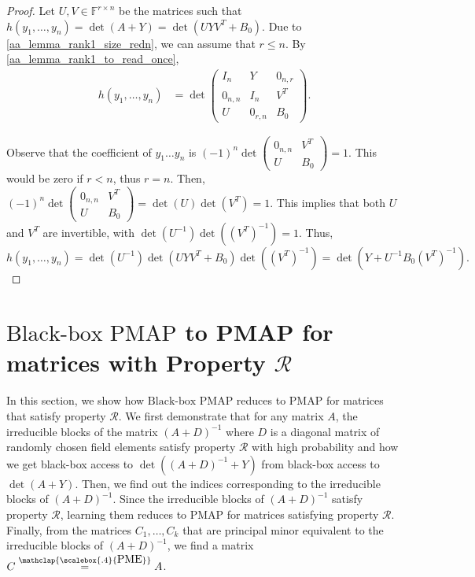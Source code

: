 \documentclass[11pt,letterpaper]{article}
\newcommand{\F}{\mathbb{F}}
\newcommand{\PME}{\stackrel{\mathclap{\scalebox{.4}{\mbox{PME}}}}{=}}
\newcommand{\prop}{\mathcal{R}}
\newcommand{\probB}{\text{Black-box PMAP}}
\begin{document}
{{{\begin{proof}

Let $U, V \in \F^{r \times n}$ be the matrices such that $h(y_1,\dots,y_n) = \det(A + Y) = \det(UYV^T + B_0)$. Due to \cref{aa_lemma_rank1_size_redn}, we can assume that $r \leq n$. By \cref{aa_lemma_rank1_to_read_once},
\begin{align*}
h(y_1,\dots,y_n) &= \det\begin{pmatrix}
        I_n & Y & 0_{n,r} \\
        0_{n,n} & I_{n} & V^T \\
        U & 0_{r,n} & B_0
    \end{pmatrix}\text{.}
\end{align*}

Observe that the coefficient of $y_1 \dots y_n$ is $(-1)^n\det\begin{pmatrix}0_{n,n} & V^T \\ U & B_0\end{pmatrix} = 1$. This would be zero if $r<n$, thus $r=n$. Then, $(-1)^n\det\begin{pmatrix}0_{n,n} & V^T \\ U & B_0\end{pmatrix} = \det(U)\det(V^T) = 1$. This implies that both $U$ and $V^T$ are invertible, with $\det(U^{-1})\det({(V^T)}^{-1}) = 1$. Thus,
\begin{equation*}
h(y_1,\dots,y_n) = \det(U^{-1})\det(UYV^T + B_0)\det({(V^T)}^{-1})
    = \det(Y + U^{-1}B_0{(V^T)}^{-1})\text{.}
\end{equation*}
\end{proof}
\section{$\probB$ to PMAP for matrices with Property $\prop$} \label{sec:reduction to matrices with prop R}

In this section, we show how $\probB$ reduces to PMAP for matrices that satisfy property $\prop$. We first demonstrate that for any matrix $A$, the irreducible blocks of the matrix $(A+D)^{-1}$ where $D$ is a diagonal matrix of randomly chosen field elements satisfy property $\prop$ with high probability and how we get black-box access to $\det((A + D)^{-1} + Y)$ from black-box access to $\det(A + Y)$. Then, we find out the indices corresponding to the irreducible blocks of $(A+D)^{-1}$. Since the irreducible blocks of $(A+D)^{-1}$ satisfy property $\prop$, learning them reduces to PMAP for matrices satisfying property $\prop$. Finally, from the matrices $C_1,\dots,C_k$ that are principal minor equivalent to the irreducible blocks of $(A+D)^{-1}$, we find a matrix $C \PME A$.

}}}
\end{document}
